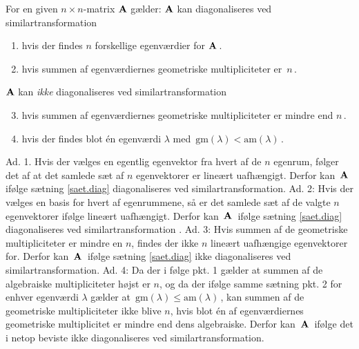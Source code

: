 \begin{theorem}\label{diagonaliserbarhed}
For en given $n\times n$-matrix $ \mathbf{A} $ gælder:\bs
 $ \mathbf{A} $ kan diagonaliseres ved similartransformation 
\begin{enumerate}
\item
hvis der findes $n$ forskellige egenværdier for  $ \mathbf{A}\,$.
\item
 hvis summen af egenværdiernes geometriske multipliciteter er $\,n\,$.
\end{enumerate}
 $ \mathbf{A} $ kan \textit{ikke} diagonaliseres ved similartransformation 
\begin{enumerate}
\setcounter{enumi}{2}
\item
hvis summen af egenværdiernes geometriske multipliciteter er mindre end $n\,$.
\item
hvis der findes blot én egenværdi $\lambda$ med $\,\mathrm{gm}(\lambda)<\mathrm{am}(\lambda)\,$.
\end{enumerate}
\end{theorem}
\begin{bevis}
Ad. 1. Hvis der vælges en egentlig egenvektor fra hvert af de $n$ egenrum, følger det af   at det samlede sæt af $n$ egenvektorer er lineært uafhængigt. Derfor kan $\,\mathbf{A}\,$ ifølge sætning \ref{saet.diag} diagonaliseres ved similartransformation.\bs
Ad. 2:
Hvis der vælges en basis for hvert af egenrummene, så er det samlede sæt af de valgte $n$ egenvektorer ifølge  lineært uafhængigt. Derfor kan $\,\mathbf{A}\,$ ifølge sætning \ref{saet.diag} diagonaliseres ved similartransformation .\bs
Ad. 3:
Hvis summen af de geometriske multipliciteter er mindre en $n$, findes der ikke $n$ lineært uafhængige egenvektorer for. Derfor kan $\,\mathbf{A}\,$ ifølge sætning \ref{saet.diag} ikke diagonaliseres ved similartransformation. \bs 
Ad. 4:
Da der i følge  pkt. 1 gælder at summen af de algebraiske multipliciteter højst er $n$, og da der ifølge samme sætning pkt. 2 for enhver egenværdi $\lambda$ gælder at $\,\mathrm{gm}(\lambda)\leq \mathrm{am}(\lambda)\,$, kan summen af de geometriske multipliciteter ikke blive $n$, hvis blot én af egenværdiernes geometriske multiplicitet er mindre end dens algebraiske. Derfor kan $\,\mathbf{A}\,$ ifølge  det i netop beviste ikke diagonaliseres ved similartransformation.
\end{bevis}


